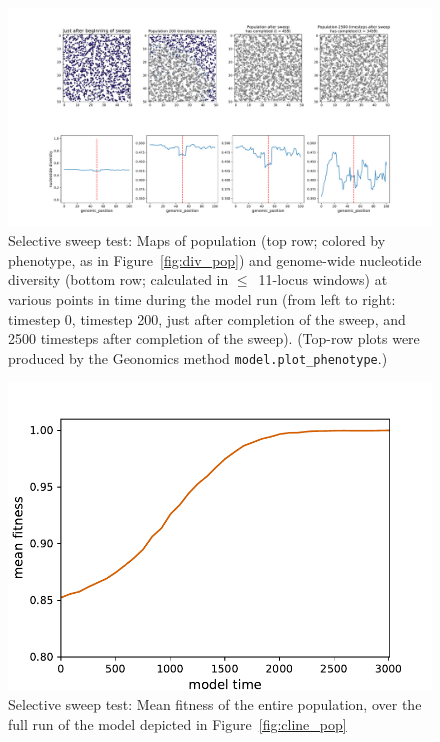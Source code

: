 ﻿\documentclass{article}
\begin{document}
\begin{figure}[!p]
        \includegraphics[width=175mm]{./img/final/SWEEP_pop_and_nuc_div.pdf}
        \caption{Selective sweep test: Maps of population (top row;
                 colored by phenotype, as in Figure~\ref{fig:div_pop})
                 and genome-wide nucleotide diversity
                 (bottom row; calculated in $\leq$~11-locus windows)
                 at various points in time during the model run
                 (from left to right: timestep 0, 
                 timestep 200, just after completion of the sweep,
                 and 2500 timesteps after completion of the sweep).
                 (Top-row plots were produced by the Geonomics method
                 \texttt{model.plot\_phenotype}.)}
       \label{fig:sweep_pop_and_nuc_div}
\end{figure}



\begin{figure}[!p]
        \includegraphics[width=150mm]{./img/final/SWEEP_mean_fit.pdf}
        \caption{Selective sweep test: Mean fitness of the entire
                 population, over the full run of the model
                 depicted in Figure~\ref{fig:cline_pop}}
        \label{fig:sweep_fit}
\end{figure}
\end{document}
